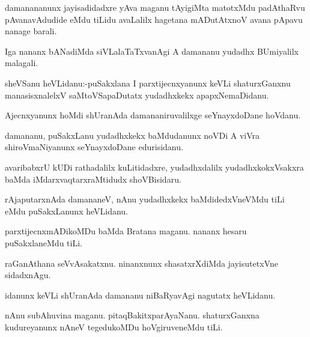 \documentclass{article}
\begin{document}
\begin{mn}%
damanananunx jayisadidadxre yAva maganu tAyigiMta matotxMdu padAthaRvu pAvanavAdudide eMdu 
tiLidu avaLalilx hagetana mADutAtxnoV avana pApavu nanage barali.
\end{mn}

\begin{mn}%
Iga nananx bANadiMda siVLalaTaTxvanAgi A damananu yudadhx BUmiyalilx malagali.
\end{mn}

\begin{mn}%
sheVSanu heVLidanu:-puSakxlana I parxtijecnxyanunx keVLi shaturxGanxnu manasisxnalelxV 
saMtoVSapaDutatx yudadhxkekx apapxNemaDidanu.
\end{mn}

\begin{mn}%
Ajecnxyanunx hoMdi shUranAda damananiruvalilxge seYnayxdoDane hoVdanu.
\end{mn}

\begin{mn}%
damananu, puSakxLanu yudadhxkekx baMdudanunx noVDi A viVra shiroVmaNiyanunx seYnayxdoDane 
edurisidanu.
\end{mn}

\begin{mn}%
avaribabxrU kUDi rathadalilx kuLitidadxre, yudadhxdalilx yudadhxkokxVsakxra baMda 
iMdarxvaqtarxraMtidudx shoVBisidaru.
\end{mn}

\begin{mn}%
rAjaputarxnAda damananeV, nAnu yudadhxkekx baMdidedxVneVMdu tiLi eMdu puSakxLanunx  
heVLidanu.
\end{mn}

\begin{mn}%
parxtijecnxmADikoMDu baMda Bratana maganu. nananx hesaru puSakxlaneMdu tiLi.
\end{mn}

\begin{mn}%
raGanAthana seVvAsakatxnu. ninanxnunx shasatxrXdiMda jayisutetxVne sidadxnAgu.
\end{mn}

\begin{mn}%
idanunx keVLi shUranAda damananu niBaRyavAgi nagutatx heVLidanu.
\end{mn}

\begin{mn}%
nAnu subAhuvina maganu. pitaqBakitxparAyaNanu. shaturxGanxna kudureyanunx nAneV tegedukoMDu
hoVgiruveneMdu tiLi.
\end{mn}
\end{document}
